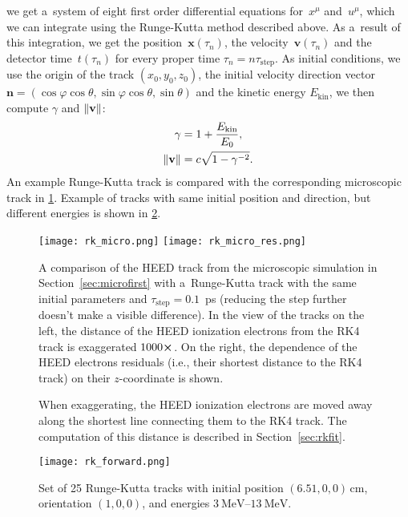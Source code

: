 		we get a~system of eight first order differential equations for~$x^\mu$ and~$u^\mu$, which we can integrate using the Runge-Kutta method described above. As a~result of this integration, we get the position~$\mathbf{x}(\tau_n)$, the velocity~$\mathbf{v}(\tau_n)$ and the detector time~$t(\tau_n)$ for every proper time $\tau_n = n \tau_\text{step}$. As initial conditions, we use the origin of the track $(x_0,y_0,z_0)$, the initial velocity direction vector $\mathbf{n} = (\cos\varphi\cos\theta,\sin\varphi\cos\theta,\sin\theta)$ and the kinetic energy $E_\text{kin}$, we then compute $\gamma$ and $\norm{\mathbf{v}}$:
			\begin{align}
				\gamma &= 1 + \frac{E_\text{kin}}{E_0},\\
				\norm{\mathbf{v}} &= c\sqrt{1-\gamma^{-2}}.
			\end{align}
		An example Runge-Kutta track is compared with the corresponding microscopic track in \cref{fig:rkmicro}. Example of tracks with same initial position and direction, but different energies is shown in \cref{fig:rk_forward}.
		
		\begin{figure}
			\centering
			\texttt{[image: rk\_micro.png]}
			\hfill
			\texttt{[image: rk\_micro\_res.png]}
			\caption{A comparison of the \ac{HEED} track from the microscopic simulation in Section~\ref{sec:microfirst} with a~Runge-Kutta track with the same initial parameters and $\tau_\text{step} = 0.1$~ps (reducing the step further doesn't make a visible difference). In the view of the tracks on the left, the distance of the \ac{HEED} ionization electrons from the \ac{RK4} track is exaggerated $1000\cross$. On the right, the dependence of the \ac{HEED} electrons residuals (i.e., their shortest distance to the \ac{RK4} track) on their $z$\protect\nobreakdash-coordinate is shown.}
			\caption*{\footnotesize{When exaggerating, the \ac{HEED} ionization electrons are moved away along the shortest line connecting them to the \ac{RK4} track. The computation of this distance is described in Section~\ref{sec:rkfit}.}}
			\label{fig:rkmicro}
		\end{figure}
		
		\begin{figure}
			\centering
			\texttt{[image: rk\_forward.png]}
			\caption{Set of \num{25} Runge-Kutta tracks with initial position $(6.51,0,0)\,\unit{\cm}$, orientation $(1,0,0)$, and energies $\qtyrange{3}{13}{\MeV}$.}
			\label{fig:rk_forward}
		\end{figure}
					
